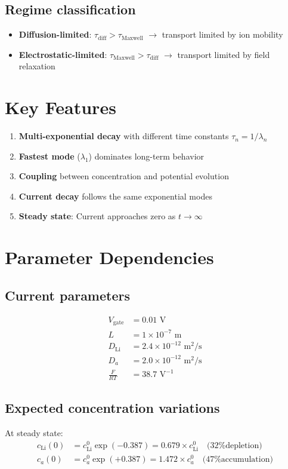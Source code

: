 \documentclass[11pt]{article}
\begin{document}
\subsection{Regime classification}
\begin{itemize}
\item \textbf{Diffusion-limited}: $\tau_{\text{diff}} > \tau_{\text{Maxwell}}$ $\rightarrow$ transport limited by ion mobility
\item \textbf{Electrostatic-limited}: $\tau_{\text{Maxwell}} > \tau_{\text{diff}}$ $\rightarrow$ transport limited by field relaxation
\end{itemize}

\section{Key Features}

\begin{enumerate}
\item \textbf{Multi-exponential decay} with different time constants $\tau_n = 1/\lambda_n$
\item \textbf{Fastest mode} ($\lambda_1$) dominates long-term behavior  
\item \textbf{Coupling} between concentration and potential evolution
\item \textbf{Current decay} follows the same exponential modes
\item \textbf{Steady state}: Current approaches zero as $t \to \infty$
\end{enumerate}

\section{Parameter Dependencies}

\subsection{Current parameters}
\begin{align}
V_{\text{gate}} &= 0.01 \text{ V} \\
L &= 1 \times 10^{-7} \text{ m} \\
D_{\text{Li}} &= 2.4 \times 10^{-12} \text{ m}^2\text{/s} \\
D_a &= 2.0 \times 10^{-12} \text{ m}^2\text{/s} \\
\frac{F}{RT} &= 38.7 \text{ V}^{-1}
\end{align}

\subsection{Expected concentration variations}
At steady state:
\begin{align}
c_{\text{Li}}(0) &= c_{\text{Li}}^0 \exp(-0.387) = 0.679 \times c_{\text{Li}}^0 \quad \text{(32\% depletion)} \\
c_a(0) &= c_a^0 \exp(+0.387) = 1.472 \times c_a^0 \quad \text{(47\% accumulation)}
\end{align}
\end{document}
